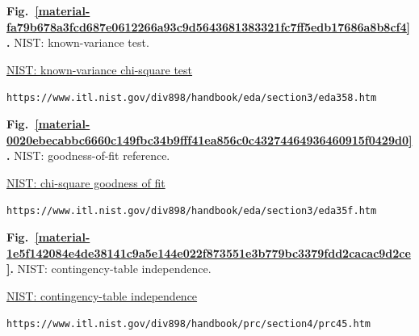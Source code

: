 \documentclass[11pt,a4paper]{article}
\begin{document}
\medskip

\par\medskip
\Needspace{10cm}
\label{material-fa79b678a3fcd687e0612266a93c9d5643681383321fc7ff5edb17686a8b8cf4}
\noindent\textbf{Fig.~\ref*{material-fa79b678a3fcd687e0612266a93c9d5643681383321fc7ff5edb17686a8b8cf4}.} NIST: known-variance test.\par\nopagebreak
\noindent\href{https://www.itl.nist.gov/div898/handbook/eda/section3/eda358.htm}{NIST: known-variance chi-square test}\par
\nolinkurl{https://www.itl.nist.gov/div898/handbook/eda/section3/eda358.htm}\par

\medskip

\par\medskip
\Needspace{10cm}
\label{material-0020ebecabbc6660c149fbc34b9fff41ea856c0c43274464936460915f0429d0}
\noindent\textbf{Fig.~\ref*{material-0020ebecabbc6660c149fbc34b9fff41ea856c0c43274464936460915f0429d0}.} NIST: goodness-of-fit reference.\par\nopagebreak
\noindent\href{https://www.itl.nist.gov/div898/handbook/eda/section3/eda35f.htm}{NIST: chi-square goodness of fit}\par
\nolinkurl{https://www.itl.nist.gov/div898/handbook/eda/section3/eda35f.htm}\par

\medskip

\par\medskip
\Needspace{10cm}
\label{material-1e5f142084e4de38141c9a5e144e022f873551e3b779bc3379fdd2cacac9d2ce}
\noindent\textbf{Fig.~\ref*{material-1e5f142084e4de38141c9a5e144e022f873551e3b779bc3379fdd2cacac9d2ce}.} NIST: contingency-table independence.\par\nopagebreak
\noindent\href{https://www.itl.nist.gov/div898/handbook/prc/section4/prc45.htm}{NIST: contingency-table independence}\par
\nolinkurl{https://www.itl.nist.gov/div898/handbook/prc/section4/prc45.htm}\par

\medskip

\clearpage
\end{document}
